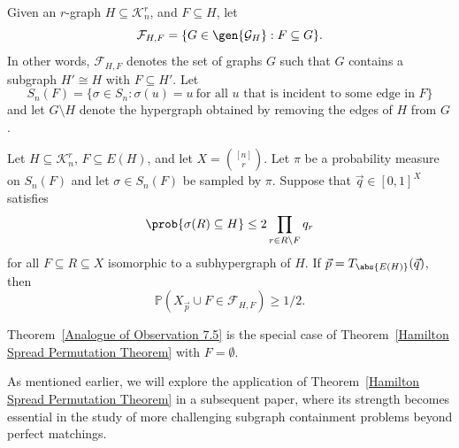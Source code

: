 \documentclass[12pt]{article}
\def\pr{{\mathbb P}}
\begin{document}
Given an $r$-graph $H\subseteq\mathcal{K}_n^r$, and $F\subseteq H$, let
\[
\mathcal{F}_{H,F}=\{G\in \gen{\mathcal{G}_H}: F\subseteq G\}.
\]
In other words,
$\mathcal{F}_{H,F}$ denotes the set of graphs $G$ such that $G$ contains a subgraph $H'\cong H$ with $F\subseteq H'$. Let
\[
    S_n(F)=\{\sigma\in S_n: \sigma(u)=u\ \text{for all $u$ that is incident to some edge in $F$}\}
\]
and let $G\setminus H$  denote the hypergraph obtained by removing the edges of $H$ from $G$.


\begin{theorem}
\label{Hamilton Spread Permutation Theorem}
Let $H\subseteq\mathcal{K}_n^r$, $F\subseteq E(H)$, and let $X = \binom{[n]}{r}$. Let $\pi$ be a probability measure on $S_n(F)$ and let $\sigma\in S_n(F)$ be sampled by $\pi$. Suppose that $\vec{q}\in [0,1]^X$  satisfies
\[
    \prob{\sigma(R)\subseteq H}\leq 2\displaystyle\prod\limits_{r\in R\setminus F} q_r
\]
for all $F\subseteq R\subseteq X$ isomorphic to a subhypergraph of $H$. If $\vec{p} = T_{\abs{E(H)}}(\vec{q})$, then
\[
\pr(X_{\vec{p}}\cup F\in \mathcal{F}_{H,F})\ge 1/2.
\]
\end{theorem}

\begin{remark}
\label{remark: Hamilton Spread Is Generalization}
\normalfont
Theorem~\ref{Analogue of Observation 7.5} is the special case of Theorem~\ref{Hamilton Spread Permutation Theorem} with $F = \emptyset$.
\end{remark}

As mentioned earlier, we will explore the application of Theorem~\ref{Hamilton Spread Permutation Theorem} in a subsequent paper, where its strength becomes essential in the study of more challenging subgraph containment problems beyond perfect matchings.
\end{document}
